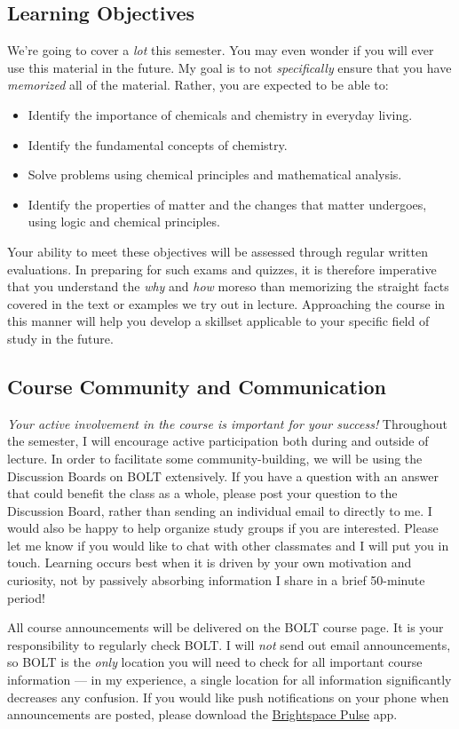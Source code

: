 \documentclass[11pt,letterpaper]{article}
\begin{document}
\subsection{Learning Objectives}
We're going to cover a \emph{lot} this semester. You may even wonder if you will
ever use this material in the future. My goal is to not \emph{specifically}
ensure that you have \emph{memorized} all of the material. Rather, you are
expected to be able to:
\begin{itemize}[noitemsep]
	\item Identify the importance of chemicals and chemistry in everyday
		living.
	\item Identify the fundamental concepts of chemistry.
	\item Solve problems using chemical principles and mathematical
		analysis.
	\item Identify the properties of matter and the changes that matter
		undergoes, using logic and chemical principles.
\end{itemize}
Your ability to meet these objectives will be assessed through regular written
evaluations. In preparing for such exams and quizzes, it is therefore imperative
that you understand the \emph{why} and \emph{how} moreso than memorizing the
straight facts covered in the text or examples we try out in lecture.
Approaching the course in this manner will help you develop a skillset
applicable to your specific field of study in the future.

\subsection{Course Community and Communication}
\emph{Your active involvement in the course is important for your success!}
Throughout the semester, I will encourage active participation both during and
outside of lecture. In order to facilitate some community-building, we will be
using the Discussion Boards on BOLT extensively. If you have a question with an
answer that could benefit the class as a whole, please post your question to the
Discussion Board, rather than sending an individual email to directly to me. I
would also be happy to help organize study groups if you are interested. Please
let me know if you would like to chat with other classmates and I will put you
in touch. Learning occurs best when it is driven by your own motivation and
curiosity, not by passively absorbing information I share in a brief 50-minute
period!

All course announcements will be delivered on the BOLT course page. It is your
responsibility to regularly check BOLT. I will \emph{not} send out email
announcements, so BOLT is the \emph{only} location you will need to check for
all important course information --- in my experience, a single location for all
information significantly decreases any confusion. If you would like push
notifications on your phone when announcements are posted, please download the
\href{https://documentation.brightspace.com/EN/brightspace/requirements/all/pulse.htm}{Brightspace
Pulse} app.
\end{document}
